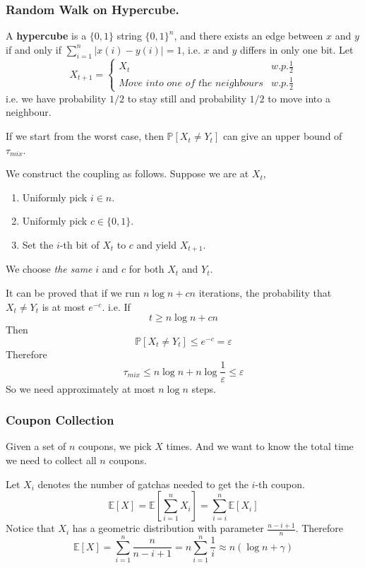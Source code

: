         \subsubsection{Random Walk on Hypercube.}
            A \textbf{hypercube} is a $\{0,1\}$ string $\{0,1\}^n$, and there exists an edge between $x$ and $y$ if and only if $\sum_{i=1}^n|x(i)-y(i)| = 1$, i.e. $x$ and $y$ differs in only one bit.
            Let
            \[
                X_{t+1} = 
                \begin{cases}
                    X_t \quad & w.p.\frac{1}{2}\\
                    \textit{Move into one of the neighbours} & w.p.\frac{1}{2}
                \end{cases}
            \]
            i.e. we have probability $1/2$ to stay still and probability $1/2$ to move into a neighbour.

            If we start from the worst case, then $\mathbb{P}[X_t \neq Y_t]$ can give an upper bound of $\tau_{mix}$.

            We construct the coupling as follows. Suppose we are at $X_t$,
            \begin{enumerate}
                \item Uniformly pick $i \in n$.
                \item Uniformly pick $c \in \{0, 1\}$.
                \item Set the $i$-th bit of $X_t$ to $c$ and yield $X_{t+1}$.
            \end{enumerate}
            We choose \emph{the same} $i$ and $c$ for both $X_t$ and $Y_t$.

            It can be proved that if we run $n\log n + cn$ iterations, the probability that $X_t \neq Y_t$ is at most $e^{-c}$. i.e.
            If
            \[ t \ge n\log n + cn \]
            Then
            \[ \mathbb{P}[X_t \ne Y_t] \le e^{-c} = \varepsilon \]
            Therefore 
            \[ \tau_{mix} \le n\log n + n\log \frac{1}{\varepsilon} \le \varepsilon\]
            So we need approximately at most $n\log n$ steps.

        \subsubsection{Coupon Collection}
            Given a set of $n$ coupons, we pick $X$ times. And we want to know the total time we need to collect all $n$ coupons.

            Let $X_i$ denotes the number of gatchas needed to get the $i$-th coupon.
            \[ \mathbb{E}[X] = \mathbb{E}[\sum_{i=1}^n X_i] = \sum_{i=i}^n \mathbb{E}[X_i] \]
            Notice that $X_i$ has a geometric distribution with parameter $\frac{n-i+1}{n}$. Therefore
            \[ \mathbb{E}[X] = \sum_{i=1}^n \frac{n}{n-i+1} = n\sum_{i=1}^n \frac{1}{i} \approx n(\log n + \gamma) \]
